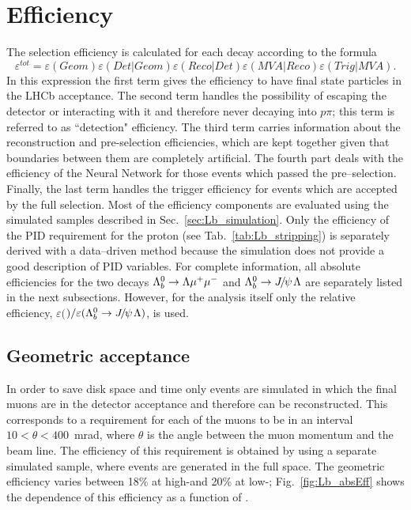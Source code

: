 \section{Efficiency}
\label{sec:Lb_eff}

The selection efficiency is calculated for each decay according to the formula
\begin{equation}
\varepsilon^{tot}=\varepsilon(Geom)\varepsilon(Det|Geom)\varepsilon(Reco|Det)\varepsilon(MVA|Reco)\varepsilon(Trig|MVA).
\end{equation}
In this expression the first term gives the efficiency to have final state particles in the LHCb acceptance.
The second term handles the possibility of \Lz escaping the detector or interacting with it and therefore
never decaying into $p\pi$; this term is referred to as ``detection" efficiency.
The third term carries information about the reconstruction and pre-selection efficiencies,
which are kept together given that boundaries between them are completely artificial.
The fourth part deals with the efficiency of the Neural Network for those events which passed the pre--selection. 
Finally, the last term handles the trigger efficiency for events which are accepted by the full selection.
Most of the efficiency components are evaluated using the simulated samples described in Sec.~\ref{sec:Lb_simulation}.
Only the efficiency of the PID requirement for the proton (see Tab.~\ref{tab:Lb_stripping}) is separately derived
with a data--driven method because the simulation does not provide a good description of PID variables.
For complete information, all absolute efficiencies for the two decays $\Lambda^0_b\rightarrow\Lambda\mu^+\mu^-$ and $\Lb\to\jpsi\Lz$ are
separately listed in the next subsections. However, for the analysis itself only the relative efficiency,
$\varepsilon($\Lb\to\Lz\mumu$)/\varepsilon(\Lb\to\jpsi\Lz)$, is used. 


\subsection{Geometric acceptance}
\label{sec:Lb_geomAcc}
In order to save disk space and time only events are simulated in which the final muons
are in the detector acceptance and therefore can be reconstructed. This corresponds to a requirement for each
of the muons to be in an interval \mbox{$10 < \theta < 400$~mrad}, where $\theta$ is the angle between
the muon momentum and the beam line. The efficiency of this requirement is obtained by using 
a separate simulated sample, where events are generated in the full space.
The geometric efficiency varies between 18\% at high-\qsq and 20\% at low-\qsq;
Fig.~\ref{fig:Lb_absEff} shows the dependence of this efficiency as a function of \qsq.

